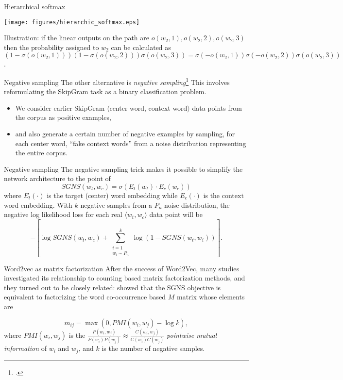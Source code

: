 \documentclass[style=upen, size=14pt]{powerdot}
\newcommand{\gold}{\color{arany}}
\theoremstyle{definition}
\begin{document}
\begin{slide}[toc=]{Hierarchical softmax}
  \begin{center}
    \texttt{[image: figures/hierarchic\_softmax.eps]}
\end{center}
Illustration: if the linear outputs on the path are $o(w_2, 1), o(w_2, 2), o(w_2, 3)$ then the
probability assigned to $w_2$ can be calculated as
$(1-\sigma(o(w_2,1)))(1-\sigma(o(w_2,2)))\sigma(o(w_2,3))=
\sigma(-o(w_2,1))\sigma(-o(w_2,2))\sigma(o(w_2,3))$.
\end{slide}

\begin{slide}[toc=]{Negative sampling}
  The other alternative is \emph{\gold negative
    sampling}\footnote{\citet{mikolov2013distributed}.} This involves
  reformulating the SkipGram task as a binary classification problem.
  \begin{itemize}
  \item We consider earlier SkipGram $\langle$center word, context word$\rangle$
    data points from the corpus as positive examples,
  \item and also generate a certain number of negative examples by sampling, for
    each center word, ``fake context words'' from a noise distribution
    representing the entire corpus.
  \end{itemize}
\end{slide}

\begin{slide}[toc=]{Negative sampling}
  The negative sampling trick makes it possible to simplify the network
  architecture to the point of
  $$
  SGNS(w_{t}, w_{c}) = \sigma(E_t(w_t)\cdot E_c(w_c)) 
  $$
  where $E_t(\cdot)$ is the target (center) word embedding while $E_c(\cdot)$ is
  the context word embedding. With $k$ negative samples from a $P_n$ noise
  distribution, the negative log likelihood loss for each real
  $\langle w_t, w_c\rangle$ data point will be
  $$
  - [ \log SGNS(w_{t}, w_{c}) + \sum_{\substack{i=1 \\ w_i \sim P_n}}^k
  \log(1 - SGNS(w_{t}, {w_i}))].  $$
\end{slide}

\begin{slide}[toc=W2V as factorization]{Word2vec as matrix factorization}
  After the success of Word2Vec, many studies investigated its relationship to
  counting based matrix factorization methods, and they turned out to be closely
  related: \cite{levy2014neural} showed that the SGNS objective is equivalent to
  factorizing the word co-occurrence based $M$ matrix whose elements are

  $$
  m_{ij} = \max(0, PMI(w_i, w_j )- \log k),
  $$
  where $PMI(w_i,w_j)$ is the
  $\frac{P(w_i, w_j)}{P(w_i)P(w_j)}\approx \frac{C(w_i, w_j)}{C(w_i)C(w_j)}$
  \emph{pointwise mutual information} of $w_i$ and $w_j$, and $k$ is the number
  of negative samples.
\end{slide}
\end{document}
